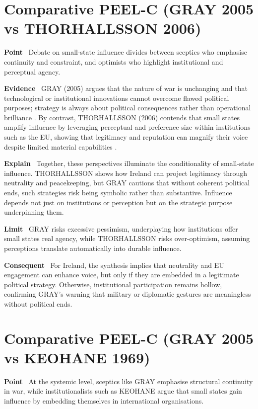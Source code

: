 \section*{Comparative PEEL-C (GRAY 2005 vs THORHALLSSON 2006)}

\textbf{Point} \
Debate on small-state influence divides between sceptics who emphasise continuity and constraint, and optimists who highlight institutional and perceptual agency.

\textbf{Evidence} \
GRAY (2005) argues that the nature of war is unchanging and that technological or institutional innovations cannot overcome flawed political purposes; strategy is always about political consequences rather than operational brilliance \parencite{GRAY_2005}. By contrast, THORHALLSSON (2006) contends that small states amplify influence by leveraging perceptual and preference size within institutions such as the EU, showing that legitimacy and reputation can magnify their voice despite limited material capabilities \parencite{THORHALLSSON_2006}.

\textbf{Explain} \
Together, these perspectives illuminate the conditionality of small-state influence. THORHALLSSON shows how Ireland can project legitimacy through neutrality and peacekeeping, but GRAY cautions that without coherent political ends, such strategies risk being symbolic rather than substantive. Influence depends not just on institutions or perception but on the strategic purpose underpinning them.

\textbf{Limit} \
GRAY risks excessive pessimism, underplaying how institutions offer small states real agency, while THORHALLSSON risks over-optimism, assuming perceptions translate automatically into durable influence.

\textbf{Consequent} \
For Ireland, the synthesis implies that neutrality and EU engagement can enhance voice, but only if they are embedded in a legitimate political strategy. Otherwise, institutional participation remains hollow, confirming GRAY’s warning that military or diplomatic gestures are meaningless without political ends.

\section*{Comparative PEEL-C (GRAY 2005 vs KEOHANE 1969)}

\textbf{Point} \
At the systemic level, sceptics like GRAY emphasise structural continuity in war, while institutionalists such as KEOHANE argue that small states gain influence by embedding themselves in international organisations.

